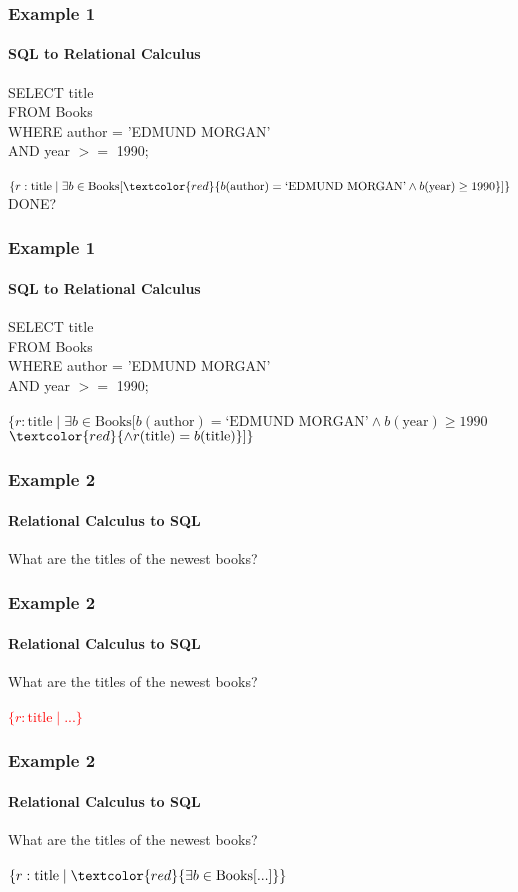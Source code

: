 \documentclass{beamer}
\begin{document}
\begin{frame}
  \frametitle{Example 1}
    \framesubtitle{SQL to Relational Calculus}
  SELECT title\\
  FROM Books\\
  WHERE author = 'EDMUND MORGAN'\\
  AND year $>=$ 1990;\\
  \hfill \\
  $\{r:\text{title} \mid \exists b \in \text{Books} [ \textcolor{red}{b(\text{author}) = \text{`EDMUND MORGAN'} \land b(\text{year}) \geq 1990} ] \}$\\
  DONE?
\end{frame}

\begin{frame}
  \frametitle{Example 1}
    \framesubtitle{SQL to Relational Calculus}
  SELECT title\\
  FROM Books\\
  WHERE author = 'EDMUND MORGAN'\\
  AND year $>=$ 1990;\\
  \hfill \\
  $\{r:\text{title} \mid \exists b \in \text{Books} [ b(\text{author}) = \text{`EDMUND MORGAN'} \land b(\text{year}) \geq 1990$\\
  $\textcolor{red}{\land r(\text{title}) = b(\text{title})}] \}$\\
\end{frame}

\begin{frame}
  \frametitle{Example 2}
    \framesubtitle{Relational Calculus to SQL}
  What are the titles of the newest books?\\
\end{frame}

\begin{frame}
  \frametitle{Example 2}
    \framesubtitle{Relational Calculus to SQL}
  What are the titles of the newest books?\\
  \hfill \\
  \textcolor{red}{$\{r:\text{title} \mid ... \}$}
\end{frame}

\begin{frame}
  \frametitle{Example 2}
    \framesubtitle{Relational Calculus to SQL}
  What are the titles of the newest books?\\
  \hfill \\
  $\{r:\text{title} \mid \textcolor{red}{\exists b \in \text{Books} [...]} \}$
\end{frame}
\end{document}
